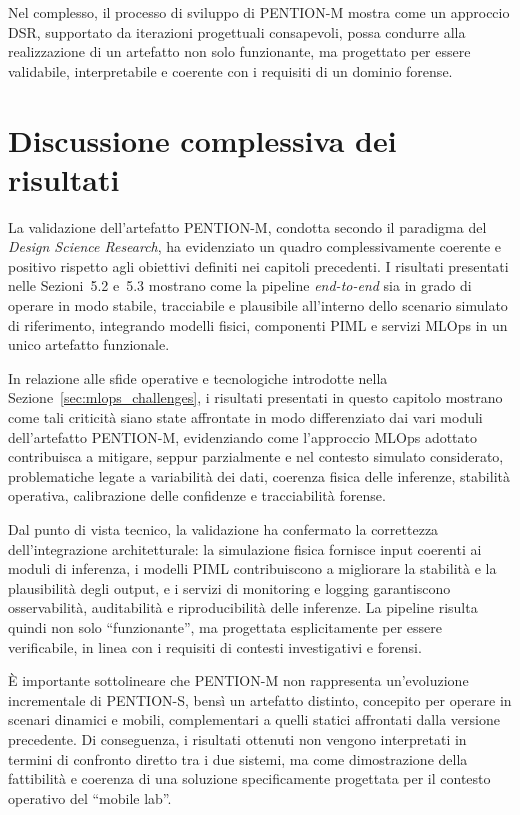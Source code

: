 Nel complesso, il processo di sviluppo di \textsc{PENTION-M} mostra come un approccio DSR, supportato da iterazioni progettuali consapevoli, possa condurre alla realizzazione di un artefatto non solo funzionante, ma progettato per essere validabile, interpretabile e coerente con i requisiti di un dominio forense.

\section{Discussione complessiva dei risultati}
\label{sec:discussion_results}

La validazione dell’artefatto \textsc{PENTION-M}, condotta secondo il paradigma del \emph{Design Science Research}, ha evidenziato un quadro complessivamente coerente e positivo rispetto agli obiettivi definiti nei capitoli precedenti. I risultati presentati nelle Sezioni~5.2 e~5.3 mostrano come la pipeline \textit{end-to-end} sia in grado di operare in modo stabile, tracciabile e plausibile all’interno dello scenario simulato di riferimento, integrando modelli fisici, componenti PIML e servizi MLOps in un unico artefatto funzionale.

In relazione alle sfide operative e tecnologiche introdotte nella Sezione~\ref{sec:mlops_challenges}, i risultati presentati in questo capitolo mostrano come tali criticità siano state affrontate in modo differenziato dai vari moduli dell’artefatto \textsc{PENTION-M}, evidenziando come l’approccio MLOps adottato contribuisca a mitigare, seppur parzialmente e nel contesto simulato considerato, problematiche legate a variabilità dei dati, coerenza fisica delle inferenze, stabilità operativa, calibrazione delle confidenze e tracciabilità forense.

Dal punto di vista tecnico, la validazione ha confermato la correttezza dell’integrazione architetturale: la simulazione fisica fornisce input coerenti ai moduli di inferenza, i modelli PIML contribuiscono a migliorare la stabilità e la plausibilità degli output, e i servizi di monitoring e logging garantiscono osservabilità, auditabilità e riproducibilità delle inferenze. La pipeline risulta quindi non solo ``funzionante'', ma progettata esplicitamente per essere verificabile, in linea con i requisiti di contesti investigativi e forensi.

È importante sottolineare che \textsc{PENTION-M} non rappresenta un’evoluzione incrementale di \textsc{PENTION-S}, bensì un artefatto distinto, concepito per operare in scenari dinamici e mobili, complementari a quelli statici affrontati dalla versione precedente. Di conseguenza, i risultati ottenuti non vengono interpretati in termini di confronto diretto tra i due sistemi, ma come dimostrazione della fattibilità e coerenza di una soluzione specificamente progettata per il contesto operativo del ``mobile lab''.


